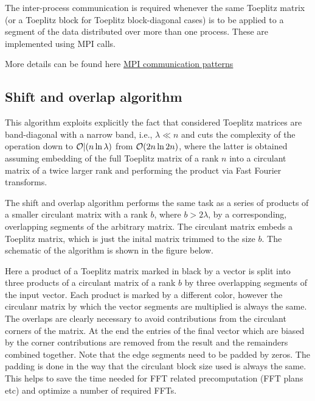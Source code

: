 The inter-\/process communication is required whenever the same Toeplitz matrix (or a Toeplitz block for Toeplitz block-\/diagonal cases) is to be applied to a segment of the data distributed over more than one process. These are implemented using M\-P\-I calls.

More details can be found here \hyperlink{toeplitz_algo_communication}{M\-P\-I communication patterns} \hypertarget{toeplitz_algo_shiftoverlap}{}\subsection{Shift and overlap algorithm}\label{toeplitz_algo_shiftoverlap}
This algorithm exploits explicitly the fact that considered Toeplitz matrices are band-\/diagonal with a narrow band, i.\-e., $\lambda \ll n$ and cuts the complexity of the operation down to $ {\cal O|}(n \ln \lambda)$ from ${\cal O}(2 n \ln 2 n)$, where the latter is obtained assuming embedding of the full Toeplitz matrix of a rank $ n$ into a circulant matrix of a twice larger rank and performing the product via Fast Fourier transforms.

The shift and overlap algorithm performs the same task as a series of products of a smaller circulant matrix with a rank $ b$, where $ b > 2\lambda$, by a corresponding, overlapping segments of the arbitrary matrix. The circulant matrix embeds a Toeplitz matrix, which is just the inital matrix trimmed to the size $ b$. The schematic of the algorithm is shown in the figure below.

 Here a product of a Toeplitz matrix marked in black by a vector is split into three products of a circulant matrix of a rank $ b$ by three overlapping segments of the input vector. Each product is marked by a different color, however the circulanr matrix by which the vector segments are multiplied is always the same. The overlaps are clearly necessary to avoid contributions from the circulant corners of the matrix. At the end the entries of the final vector which are biased by the corner contributions are removed from the result and the remainders combined together. Note that the edge segments need to be padded by zeros. The padding is done in the way that the circulant block size used is always the same. This helps to save the time needed for F\-F\-T related precomputation (F\-F\-T plans etc) and optimize a number of required F\-F\-Ts.

